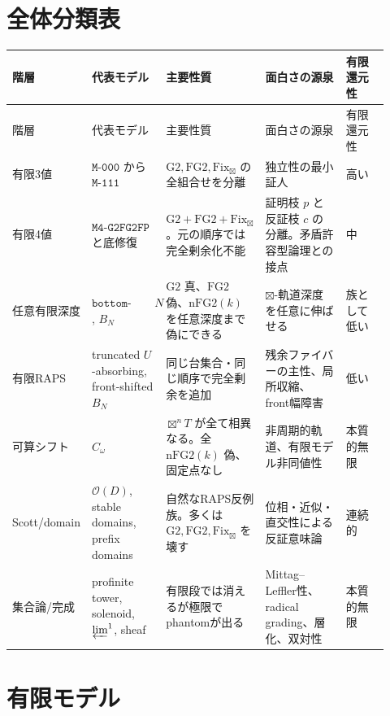 \documentclass[uplatex,dvipdfmx,a4paper,10pt]{jsarticle}
\newcommand{\Gtwo}{\mathrm{G2}}
\newcommand{\FGtwo}{\mathrm{FG2}}
\newcommand{\nFGtwo}{\mathrm{nFG2}}
\newcommand{\Fix}{\mathrm{Fix}}
\newcommand{\bt}{\boxtimes}
\begin{document}
\section{全体分類表}

\begin{longtable}{>{\raggedright\arraybackslash}p{0.16\linewidth}
                  >{\raggedright\arraybackslash}p{0.20\linewidth}
                  >{\raggedright\arraybackslash}p{0.22\linewidth}
                  >{\raggedright\arraybackslash}p{0.22\linewidth}
                  >{\raggedright\arraybackslash}p{0.12\linewidth}}
\toprule
階層 & 代表モデル & 主要性質 & 面白さの源泉 & 有限還元性 \\
\midrule
\endfirsthead
\toprule
階層 & 代表モデル & 主要性質 & 面白さの源泉 & 有限還元性 \\
\midrule
\endhead
有限3値 &
\(\texttt{M-000}\) から \(\texttt{M-111}\) &
\(\Gtwo,\FGtwo,\Fix_{\bt}\) の全組合せを分離 &
独立性の最小証人 &
高い \\
\midrule
有限4値 &
\(\texttt{M4-G2FG2FP}\) と底修復 &
\(\Gtwo+\FGtwo+\Fix_{\bt}\)。元の順序では完全剰余化不能 &
証明枝 \(p\) と反証枝 \(c\) の分離。矛盾許容型論理との接点 &
中 \\
\midrule
任意有限深度 &
\(\texttt{bottom-nfg2-depth-}N\), \(B_N\) &
\(\Gtwo\) 真、\(\FGtwo\) 偽、\(\nFGtwo(k)\) を任意深度まで偽にできる &
\(\bt\)-軌道深度を任意に伸ばせる &
族として低い \\
\midrule
有限RAPS &
truncated \(U\)-absorbing, front-shifted \(B_N\) &
同じ台集合・同じ順序で完全剰余を追加 &
残余ファイバーの主性、局所収縮、front幅障害 &
低い \\
\midrule
可算シフト &
\(C_\omega\) &
\(\bt^nT\) が全て相異なる。全 \(\nFGtwo(k)\) 偽、固定点なし &
非周期的軌道、有限モデル非同値性 &
本質的無限 \\
\midrule
Scott/domain &
\(\mathcal O(D)\), stable domains, prefix domains &
自然なRAPS反例族。多くは \(\Gtwo,\FGtwo,\Fix_{\bt}\) を壊す &
位相・近似・直交性による反証意味論 &
連続的 \\
\midrule
集合論/完成 &
profinite tower, solenoid, \(\varprojlim^1\), sheaf &
有限段では消えるが極限でphantomが出る &
Mittag--Leffler性、radical grading、層化、双対性 &
本質的無限 \\
\bottomrule
\end{longtable}

\section{有限モデル}
\end{document}
